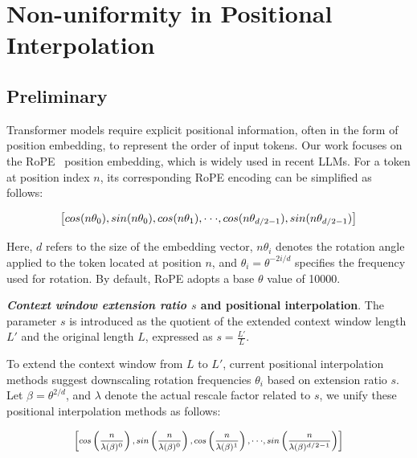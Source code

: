 \section{Non-uniformity in Positional Interpolation}
\label{sec:analysis}

\subsection{Preliminary}

Transformer models require explicit positional information, often in the form of position embedding, to represent the order of input tokens. Our work focuses on the RoPE~\cite{rope} position embedding, which is widely used in recent  LLMs. For a token at position index $n$, its corresponding RoPE encoding can be simplified as follows:

\begin{equation}
		\fontsize{7.8}{7.8} \selectfont
	\label{eq:rope}
	\left[ cos(n\theta_0), sin(n\theta_0), cos(n\theta_1), \cdot\cdot\cdot, cos(n\theta_{d/2-1}), sin(n\theta_{d/2-1}) \right]   
\end{equation}

Here, $d$ refers to the size of the embedding vector, $n\theta_i$ denotes the rotation angle applied to the token located at position $n$, and $\theta_i=\theta^{-2i/d}$ specifies the frequency used for rotation. By default, RoPE adopts a base $\theta$ value of 10000.

\textbf{\emph{Context window extension ratio $s$} and positional interpolation}. The parameter $s$ is introduced as the quotient of the extended context window length $L'$ and the original length $L$, expressed as $s=\frac{L'}{L}$.

To extend the context window from $L$ to $L'$, current positional interpolation methods suggest downscaling rotation frequencies $\theta_i$ based on extension ratio $s$. Let $\beta=\theta^{2/d}$, and $\lambda$ denote the actual rescale factor related to $s$, we   unify these positional interpolation methods as follows:

\begin{equation}	
	\fontsize{7.5}{7.5} \selectfont
	\label{eq:unified_rope}
	\begin{aligned}
		\left[cos\left(\frac{n}{\lambda(\beta)^0}\right), sin \left(\frac{n}{\lambda(\beta)^0}\right), cos\left(\frac{n}{\lambda(\beta)^1}\right), \cdot\cdot\cdot,  sin \left(\frac{n}{\lambda(\beta)^{d/2-1}}\right) \right]   
	\end{aligned}
\end{equation}

